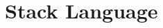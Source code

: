 \documentclass[12pt]{article}
\newenvironment{proof}[1][Proof]{
\paragraph{#1}
}{
\begin{flushright}
$\blacksquare$
\end{flushright}
}
\begin{document}






\section*{Stack Language}
\end{document}
